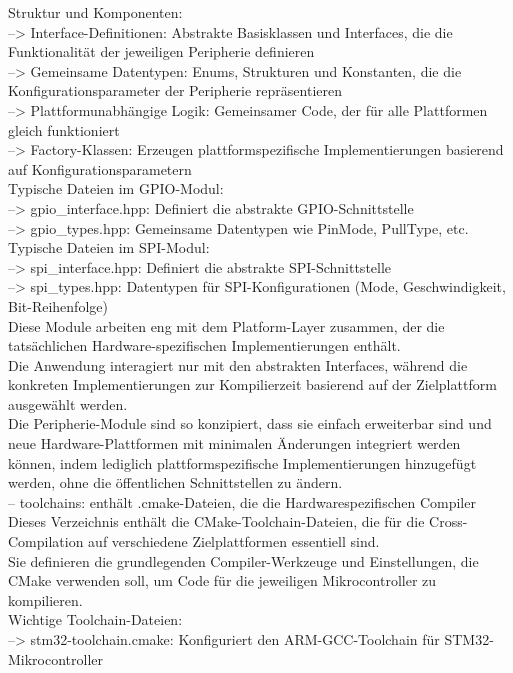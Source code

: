 	Struktur und Komponenten:\\
	--> Interface-Definitionen: Abstrakte Basisklassen und Interfaces, die die Funktionalität der jeweiligen Peripherie definieren\\
	--> Gemeinsame Datentypen: Enums, Strukturen und Konstanten, die die Konfigurationsparameter der Peripherie repräsentieren\\
	--> Plattformunabhängige Logik: Gemeinsamer Code, der für alle Plattformen gleich funktioniert\\
	--> Factory-Klassen: Erzeugen plattformspezifische Implementierungen basierend auf Konfigurationsparametern\\
	Typische Dateien im GPIO-Modul:\\
	--> gpio\_interface.hpp: Definiert die abstrakte GPIO-Schnittstelle\\
	--> gpio\_types.hpp: Gemeinsame Datentypen wie PinMode, PullType, etc.\\
	Typische Dateien im SPI-Modul:\\
	--> spi\_interface.hpp: Definiert die abstrakte SPI-Schnittstelle\\
	--> spi\_types.hpp: Datentypen für SPI-Konfigurationen (Mode, Geschwindigkeit, Bit-Reihenfolge)\\
	Diese Module arbeiten eng mit dem Platform-Layer zusammen, der die tatsächlichen Hardware-spezifischen Implementierungen enthält.\\ Die Anwendung interagiert nur mit den abstrakten Interfaces, während die konkreten Implementierungen zur Kompilierzeit basierend auf der Zielplattform ausgewählt werden.\\
	Die Peripherie-Module sind so konzipiert, dass sie einfach erweiterbar sind und neue Hardware-Plattformen mit minimalen Änderungen integriert werden können, indem lediglich plattformspezifische Implementierungen hinzugefügt werden, ohne die öffentlichen Schnittstellen zu ändern.\\
-- toolchains: enthält .cmake-Dateien, die die Hardwarespezifischen Compiler \\
	Dieses Verzeichnis enthält die CMake-Toolchain-Dateien, die für die Cross-Compilation auf verschiedene Zielplattformen essentiell sind.\\
	Sie definieren die grundlegenden Compiler-Werkzeuge und Einstellungen, die CMake verwenden soll, um Code für die jeweiligen Mikrocontroller zu kompilieren.\\
	Wichtige Toolchain-Dateien:\\
	--> stm32-toolchain.cmake: Konfiguriert den ARM-GCC-Toolchain für STM32-Mikrocontroller\\

